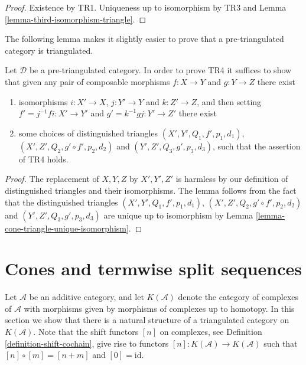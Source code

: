 \begin{proof}
Existence by TR1. Uniqueness up to isomorphism by TR3 and
Lemma \ref{lemma-third-isomorphism-triangle}.
\end{proof}

\noindent
The following lemma makes it slightly easier to prove that a
pre-triangulated category is triangulated.

\begin{lemma}
\label{lemma-easier-axiom-four}
Let $\mathcal{D}$ be a pre-triangulated category.
In order to prove TR4 it suffices to show that given
any pair of composable morphisms
$f : X \to Y$ and $g : Y \to Z$ there exist
\begin{enumerate}
\item isomorphisms $i : X' \to X$, $j : Y' \to Y$ and
$k : Z' \to Z$, and then setting $f' = j^{-1}fi : X' \to Y'$ and
$g' = k^{-1}gj : Y' \to Z'$ there exist
\item
some choices of distinguished triangles
$(X', Y', Q_1, f', p_1, d_1)$,
$(X', Z', Q_2, g' \circ f', p_2, d_2)$
and
$(Y', Z', Q_3, g', p_3, d_3)$,
such that the assertion of TR4 holds.
\end{enumerate}
\end{lemma}

\begin{proof}
The replacement of $X, Y, Z$ by $X', Y', Z'$ is harmless by our
definition of distinguished triangles and their isomorphisms.
The lemma follows from the fact that the distinguished triangles
$(X', Y', Q_1, f', p_1, d_1)$,
$(X', Z', Q_2, g' \circ f', p_2, d_2)$
and
$(Y', Z', Q_3, g', p_3, d_3)$
are unique up to isomorphism by
Lemma \ref{lemma-cone-triangle-unique-isomorphism}.
\end{proof}










\section{Cones and termwise split sequences}
\label{section-cones}

\noindent
Let $\mathcal{A}$ be an additive category, and let
$K(\mathcal{A})$ denote the category of complexes of
$\mathcal{A}$ with morphisms given by morphisms of
complexes up to homotopy. In this section we show that
there is a natural structure of a triangulated category on
$K(\mathcal{A})$. Note that the shift functors
$[n]$ on complexes, see Definition \ref{definition-shift-cochain},
give rise to functors $[n] : K(\mathcal{A}) \to K(\mathcal{A})$
such that $[n] \circ [m] = [n + m]$ and $[0] = \text{id}$.

